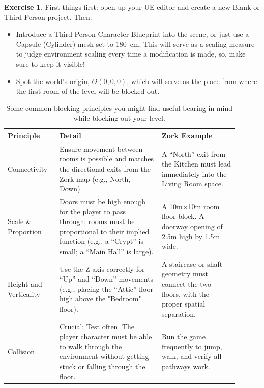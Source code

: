 \documentclass[a4paper]{tufte-handout}
\theoremstyle{definition}
\newtheorem{exercise}{Exercise}
\begin{document}
	\begin{exercise}\label{ex:blockout setup}
		First things first: open up your UE editor and create a new Blank or Third Person project. Then:
		\begin{itemize}
			\item Introduce a Third Person Character Blueprint into the scene, or just use a Capsule (Cylinder) mesh set to \SI{180}{\centi\metre}. This will serve as a scaling measure to judge environment scaling every time a modification is made, so, make sure to keep it visible!
			\item Spot the world's origin, $O(0,0,0)$, which will serve as the place from where the first room of the level will be blocked out.
		\end{itemize}
	\end{exercise}

	\begin{table}[!tb]
		\centering
		\begin{tabular}{p{0.2\linewidth}p{0.4\linewidth}p{0.3\linewidth}}
			\toprule
			\textbf{Principle} & \textbf{Detail} & \textbf{Zork Example} \\\midrule
			Connectivity & Ensure movement between rooms is possible and matches the directional exits from the Zork map (e.g., North, Down). & A ``North'' exit from the Kitchen must lead immediately into the Living Room space. \\
			Scale \& Proportion	& Doors must be high enough for the player to pass through; rooms must be proportional to their implied function (e.g., a ``Crypt'' is small; a ``Main Hall'' is large). & A 10m×10m room floor block. A doorway opening of 2.5m high by 1.5m wide.\\
			Height and Verticality & Use the Z-axis correctly for ``Up'' and ``Down'' movements (e.g., placing the ``Attic'' floor high above the "Bedroom" floor). & A staircase or shaft geometry must connect the two floors, with the proper spatial separation. \\
			Collision & Crucial: Test often. The player character must be able to walk through the environment without getting stuck or falling through the floor. & Run the game frequently to jump, walk, and verify all pathways work.\\\bottomrule
		\end{tabular}
		\caption{Some common blocking principles you might find useful bearing in mind while blocking out your level.}
		\label{tab:blockout principles}
	\end{table}
\end{document}
